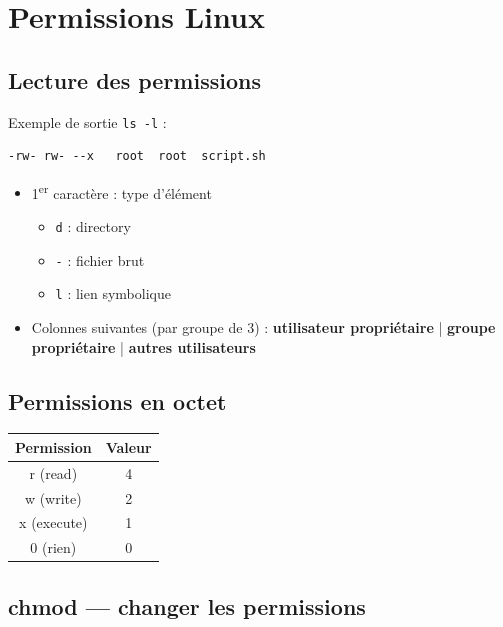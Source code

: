 \documentclass[a4paper,12pt]{article}
\begin{document}
\section{Permissions Linux}

\subsection{Lecture des permissions}

Exemple de sortie \texttt{ls -l} :
\begin{lstlisting}
-rw- rw- --x   root  root  script.sh
\end{lstlisting}

\begin{itemize}
    \item 1\textsuperscript{er} caractère : type d'élément
        \begin{itemize}
            \item \texttt{d} : directory
            \item \texttt{-} : fichier brut
            \item \texttt{l} : lien symbolique
        \end{itemize}
    \item Colonnes suivantes (par groupe de 3) : \textbf{utilisateur propriétaire} | \textbf{groupe propriétaire} | \textbf{autres utilisateurs}
\end{itemize}

\subsection{Permissions en octet}

\begin{center}
\begin{tabular}{|c|c|}
    \hline
    \textbf{Permission} & \textbf{Valeur} \\
    \hline
    r (read)    & 4 \\
    w (write)   & 2 \\
    x (execute) & 1 \\
    0 (rien)    & 0 \\
    \hline
\end{tabular}
\end{center}

\subsection{chmod — changer les permissions}
\end{document}
